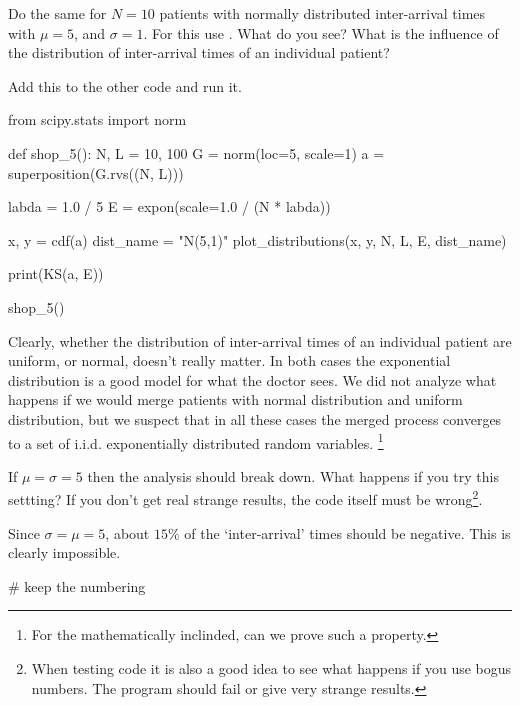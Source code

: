 \begin{exercise}
Do the same for $N=10$ patients with normally distributed inter-arrival times with $\mu=5$, and $\sigma =1$.
For this use . What do you see? What is the influence of the distribution of inter-arrival times of an individual patient?
\begin{solution}
Add this to the other code and run it.
\begin{pyverbatim}
from scipy.stats import norm


def shop_5():
    N, L = 10, 100
    G = norm(loc=5, scale=1)
    a = superposition(G.rvs((N, L)))

    labda = 1.0 / 5
    E = expon(scale=1.0 / (N * labda))

    x, y = cdf(a)
    dist_name = "N(5,1)"
    plot_distributions(x, y, N, L, E, dist_name)

    print(KS(a, E))


shop_5()
\end{pyverbatim}

Clearly, whether the distribution of inter-arrival times of an individual patient are uniform, or normal, doesn't really matter.
In both cases the exponential distribution is a good model for what the doctor sees.
We did not analyze what happens if we would merge patients with normal distribution and uniform distribution, but we suspect that in all these cases the merged process converges to a set of i.i.d.
exponentially distributed random variables.
\footnote{For the mathematically inclinded, can we prove such a property.}

\end{solution}
\end{exercise}

\begin{exercise}
  If $\mu=\sigma=5$ then the analysis should break down.
  What happens if you try this settting?
  If you don't get real strange results, the code itself must be wrong\footnote{When testing code it is also a good idea to see what happens if you use bogus numbers.
    The program should fail or give very strange results.}.
\begin{solution}
  Since $\sigma=\mu=5$, about $15\%$ of the `inter-arrival' times should be negative. This is clearly impossible.
\begin{pyverbatim}
# keep the numbering
\end{pyverbatim}
\end{solution}
\end{exercise}



